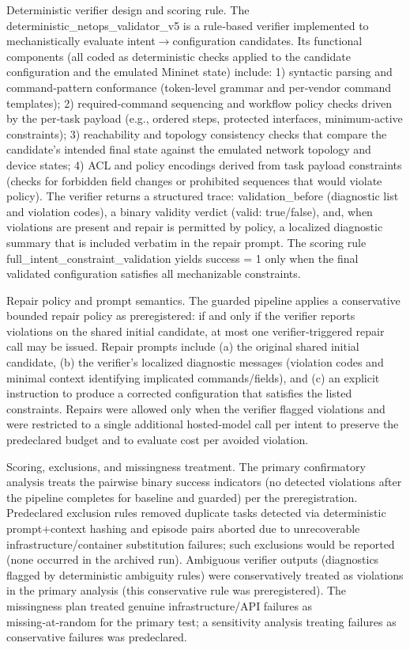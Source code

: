 \documentclass[conference]{IEEEtran}
\begin{document}
Deterministic verifier design and scoring rule. The deterministic\_netops\_validator\_v5 is a rule‑based verifier implemented to mechanistically evaluate intent\ensuremath{\rightarrow}configuration candidates. Its functional components (all coded as deterministic checks applied to the candidate configuration and the emulated Mininet state) include:
1) syntactic parsing and command‑pattern conformance (token‑level grammar and per‑vendor command templates);
2) required‑command sequencing and workflow policy checks driven by the per‑task payload (e.g., ordered steps, protected interfaces, minimum‑active constraints);
3) reachability and topology consistency checks that compare the candidate's intended final state against the emulated network topology and device states;
4) ACL and policy encodings derived from task payload constraints (checks for forbidden field changes or prohibited sequences that would violate policy). The verifier returns a structured trace: validation\_before (diagnostic list and violation codes), a binary validity verdict (valid: true/false), and, when violations are present and repair is permitted by policy, a localized diagnostic summary that is included verbatim in the repair prompt. The scoring rule full\_intent\_constraint\_validation yields success = 1 only when the final validated configuration satisfies all mechanizable constraints.

Repair policy and prompt semantics. The guarded pipeline applies a conservative bounded repair policy as preregistered: if and only if the verifier reports violations on the shared initial candidate, at most one verifier‑triggered repair call may be issued. Repair prompts include (a) the original shared initial candidate, (b) the verifier's localized diagnostic messages (violation codes and minimal context identifying implicated commands/fields), and (c) an explicit instruction to produce a corrected configuration that satisfies the listed constraints. Repairs were allowed only when the verifier flagged violations and were restricted to a single additional hosted‑model call per intent to preserve the predeclared budget and to evaluate cost per avoided violation.

Scoring, exclusions, and missingness treatment. The primary confirmatory analysis treats the pairwise binary success indicators (no detected violations after the pipeline completes for baseline and guarded) per the preregistration. Predeclared exclusion rules removed duplicate tasks detected via deterministic prompt+context hashing and episode pairs aborted due to unrecoverable infrastructure/container substitution failures; such exclusions would be reported (none occurred in the archived run). Ambiguous verifier outputs (diagnostics flagged by deterministic ambiguity rules) were conservatively treated as violations in the primary analysis (this conservative rule was preregistered). The missingness plan treated genuine infrastructure/API failures as missing‑at‑random for the primary test; a sensitivity analysis treating failures as conservative failures was predeclared.
\end{document}
